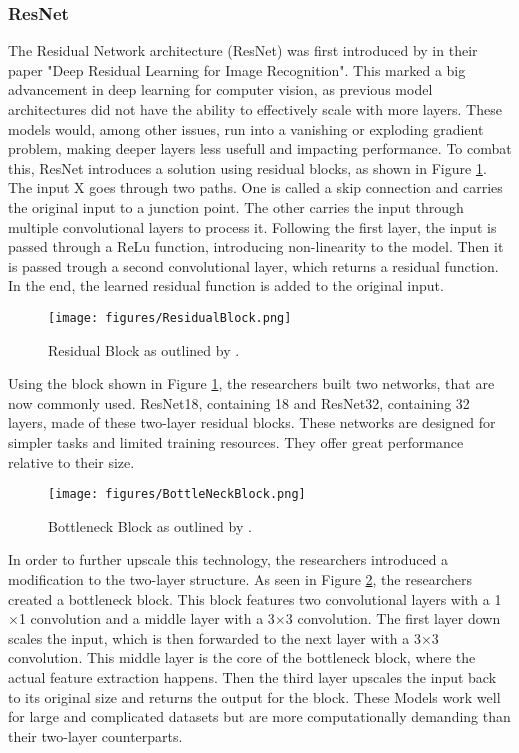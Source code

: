 \subsubsection{ResNet}\label{resnet}
The Residual Network architecture (ResNet) was first introduced by \citep{he2015deep} in their paper "Deep Residual Learning for Image Recognition". This marked a big advancement in deep learning for computer vision, as previous model architectures did not have the ability to effectively scale with more layers. These models would, among other issues, run into a vanishing or exploding gradient problem, making deeper layers less usefull and impacting performance. To combat this, ResNet introduces a solution using residual blocks, as shown in Figure \ref{fig:residualBlock}. The input X goes through two paths. One is called a skip connection and carries the original input to a junction point. The other carries the input through multiple convolutional layers to process it. Following the first layer, the input is passed through a ReLu function, introducing non-linearity to the model. Then it is passed trough a second convolutional layer, which returns a residual function. In the end, the learned residual function is added to the original input.
\begin{figure}[ht]
    \centering
    \texttt{[image: figures/ResidualBlock.png]}
    \caption{Residual Block as outlined by \citeauthor{he2015deep}.}\label{fig:residualBlock}
\end{figure}

\label{resnet18}
Using the block shown in Figure \ref{fig:residualBlock}, the researchers built two networks, that are now commonly used. ResNet18, containing 18 and ResNet32, containing 32 layers, made of these two-layer residual blocks. These networks are designed for simpler tasks and limited training resources. They offer great performance relative to their size.

\begin{figure}[ht]
    \centering
    \texttt{[image: figures/BottleNeckBlock.png]}
    \caption{Bottleneck Block as outlined by \citeauthor{he2015deep}.}\label{fig:bottleneckBlock}
\end{figure}

\label{resnet152}
In order to further upscale this technology, the researchers introduced a modification to the two-layer structure. As seen in Figure \ref{fig:bottleneckBlock}, the researchers created a bottleneck block. This block features two convolutional layers with a 1$\times$1 convolution and a middle layer with a  3$\times$3 convolution. The first layer down scales the input, which is then forwarded to the next layer with a 3$\times$3 convolution. This middle layer is the core of the bottleneck block, where the actual feature extraction happens. Then the third layer upscales the input back to its original size and returns the output for the block. These Models work well for large and complicated datasets but are more computationally demanding than their two-layer counterparts. 